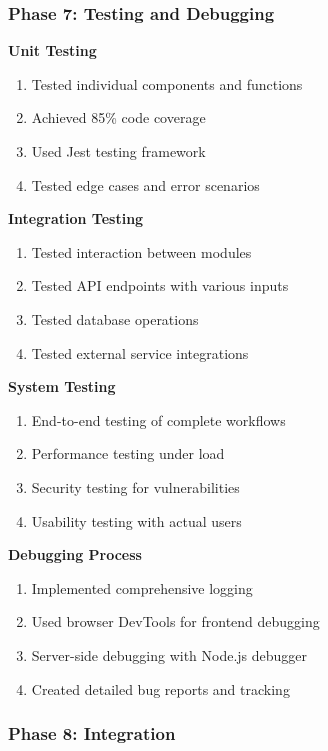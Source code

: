 \documentclass[12pt,a4paper]{report}
\begin{document}
\subsubsection{Phase 7: Testing and Debugging}

\textbf{Unit Testing}
\begin{enumerate}[label=\roman*)]
    \item Tested individual components and functions
    \item Achieved 85\% code coverage
    \item Used Jest testing framework
    \item Tested edge cases and error scenarios
\end{enumerate}

\textbf{Integration Testing}
\begin{enumerate}[label=\roman*)]
    \item Tested interaction between modules
    \item Tested API endpoints with various inputs
    \item Tested database operations
    \item Tested external service integrations
\end{enumerate}

\textbf{System Testing}
\begin{enumerate}[label=\roman*)]
    \item End-to-end testing of complete workflows
    \item Performance testing under load
    \item Security testing for vulnerabilities
    \item Usability testing with actual users
\end{enumerate}

\textbf{Debugging Process}
\begin{enumerate}[label=\roman*)]
    \item Implemented comprehensive logging
    \item Used browser DevTools for frontend debugging
    \item Server-side debugging with Node.js debugger
    \item Created detailed bug reports and tracking
\end{enumerate}

\subsubsection{Phase 8: Integration}
\end{document}
